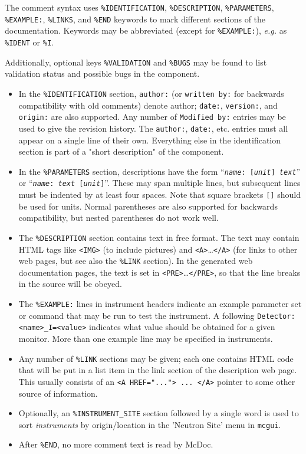 The comment syntax uses \verb+%IDENTIFICATION+, \verb+%DESCRIPTION+,
\verb+%PARAMETERS+, \verb+%EXAMPLE:+, \verb+%LINKS+, and \verb+%END+
keywords to mark different sections of the documentation. Keywords may
be abbreviated (except for \verb+%EXAMPLE:+), \textit{e.g.} as \verb+%IDENT+ or \verb+%I+.

Additionally, optional keys \verb+%VALIDATION+ and \verb+%BUGS+ may be found to list validation status and possible bugs in the component.

\begin{itemize}
\item In the \verb+%IDENTIFICATION+
  section, \verb+author:+ (or \verb+written by:+ for backwards
  compatibility with old comments) denote author; \verb+date:+,
  \verb+version:+, and \verb+origin:+ are also supported. Any number of
  \verb+Modified by:+ entries may be used to give the revision history.
  The \verb+author:+, \verb+date:+, etc. entries must all
  appear on a single line of their own. Everything else in the
  identification section is part of a "short description" of the
  component.
\item In the \verb+%PARAMETERS+
  section, descriptions have the form
  \hbox{``\texttt{{\it name\/}:~[{\it unit\/}] {\it text\/}}''}
  or \hbox{``\texttt{{\it name\/}:~{\it text\/} [{\it unit\/}]}''}.
  These may span multiple lines, but subsequent lines must be
  indented by at least four spaces. Note that square brackets \verb+[]+ should
  be used for units. Normal parentheses are also supported for backwards
  compatibility, but nested parentheses do not work well.
\item The \verb+%DESCRIPTION+
  section contains text in free format. The text may contain HTML tags
  like \verb+<IMG>+ (to include pictures) and
  \verb+<A>+\ldots\verb+</A>+
  (for links to other web pages, but see also the \verb+%LINK+
  section). In the generated web documentation pages, the text is set in
  \verb+<PRE>+\ldots\verb+</PRE>+, so that the line breaks in the source
  will be obeyed.
\item The \verb+%EXAMPLE:+
  lines in instrument headers indicate an example parameter set or command that may be
  run to test the instrument. A following \verb+Detector: <name>_I=<value>+
  indicates what value should be obtained for a given monitor. More than one example
  line may be specified in instruments.
\item Any number of \verb+%LINK+
  sections may be given; each one contains HTML code that will be put in
  a list item in the link section of the description web page. This
  usually consists of an \verb+<A HREF="..."> ... </A>+ pointer to some
  other source of information.
\item Optionally, an \verb+%INSTRUMENT_SITE+ section followed by a single word is used to sort \emph{instruments} by origin/location in the 'Neutron Site' menu in \verb+mcgui+.
\item After \verb+%END+, no more comment text is read by McDoc.
\end{itemize}
